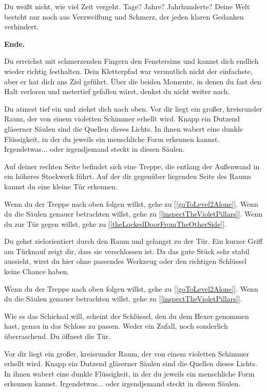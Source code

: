 Du weißt nicht, wie viel Zeit vergeht. Tage? Jahre? Jahrhunderte? Deine Welt besteht nur noch aus Verzweiflung und Schmerz, der jeden klaren Gedanken verhindert.

\textbf{Ende.}


Du erreichst mit schmerzenden Fingern den Fenstersims und kannst dich endlich wieder richtig festhalten. Dein Kletterpfad war vermutlich nicht der einfachste, aber er hat dich ans Ziel geführt. Über die beiden Momente, in denen du fast den Halt verloren und metertief gefallen wärst, denkst du nicht weiter nach.

Du atmest tief ein und ziehst dich nach oben. Vor dir liegt ein großer, kreisrunder Raum, der von einem violetten Schimmer erhellt wird. Knapp ein Dutzend gläserner Säulen sind die Quellen dieses Lichts. In ihnen wabert eine dunkle Flüssigkeit, in der du jeweils ein menschliche Form erkennen kannst. Irgendetwas... oder irgendjemand steckt in diesen Säulen.

Auf deiner rechten Seite befindet sich eine Treppe, die entlang der Außenwand in ein höheres Stockwerk führt. Auf der dir gegenüber liegenden Seite des Raums kannst du eine kleine Tür erkennen.

Wenn du der Treppe nach oben folgen willst, gehe zu [\ref{goToLevel2Alone}].
Wenn du die Säulen genauer betrachten willst, gehe zu [\ref{inspectTheVioletPillars}].
Wenn du zur Tür gegen willst, gehe zu [\ref{theLockedDoorFromTheOtherSide}].


Du gehst zielorientiert durch den Raum und gelangst zu der Tür. Ein kurzer Griff am Türknauf zeigt dir, dass sie verschlossen ist. Da das gute Stück sehr stabil aussieht, wirst du hier ohne passendes Werkzeug oder den richtigen Schlüssel keine Chance haben.

Wenn du der Treppe nach oben folgen willst, gehe zu [\ref{goToLevel2Alone}].
Wenn du die Säulen genauer betrachten willst, gehe zu [\ref{inspectTheVioletPillars}].


Wie es das Schicksal will, scheint der Schlüssel, den du dem Hexer genommen hast, genau in das Schloss zu passen. Weder ein Zufall, noch sonderlich überraschend. Du öffnest die Tür.

Vor dir liegt ein großer, kreisrunder Raum, der von einem violetten Schimmer erhellt wird. Knapp ein Dutzend gläserner Säulen sind die Quellen dieses Lichts. In ihnen wabert eine dunkle Flüssigkeit, in der du jeweils ein menschliche Form erkennen kannst. Irgendetwas... oder irgendjemand steckt in diesen Säulen.

